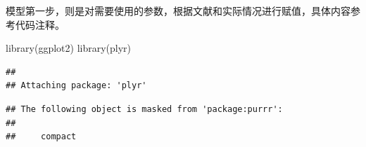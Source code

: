 \documentclass[
]{krantz}
\makeatletter
\newenvironment{Shaded}{\begin{snugshade}}{\end{snugshade}}
\newcommand{\FunctionTok}[1]{\textcolor[rgb]{0.00,0.00,0.00}{#1}}
\newcommand{\NormalTok}[1]{#1}
\newenvironment{kframe}{%
\medskip{}
\setlength{\fboxsep}{.8em}
 \def\at@end@of@kframe{}%
 \ifinner\ifhmode%
  \def\at@end@of@kframe{\end{minipage}}%
  \begin{minipage}{\columnwidth}%
 \fi\fi%
 \def\FrameCommand##1{\hskip\@totalleftmargin \hskip-\fboxsep
 \colorbox{shadecolor}{##1}\hskip-\fboxsep
     \hskip-\linewidth \hskip-\@totalleftmargin \hskip\columnwidth}%
 \MakeFramed {\advance\hsize-\width
   \@totalleftmargin\z@ \linewidth\hsize
   \@setminipage}}%
 {\par\unskip\endMakeFramed%
 \at@end@of@kframe}
\renewenvironment{Shaded}{\begin{kframe}}{\end{kframe}}
\makeatother
\begin{document}
模型第一步，则是对需要使用的参数，根据文献和实际情况进行赋值，具体内容参考代码注释。

\begin{Shaded}
\begin{Highlighting}[]
\FunctionTok{library}\NormalTok{(ggplot2)}
\FunctionTok{library}\NormalTok{(plyr)}
\end{Highlighting}
\end{Shaded}

\begin{verbatim}
## 
## Attaching package: 'plyr'
\end{verbatim}

\begin{verbatim}
## The following object is masked from 'package:purrr':
## 
##     compact
\end{verbatim}
\end{document}
